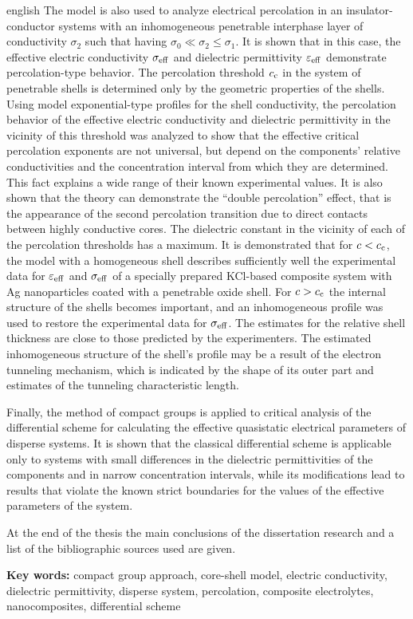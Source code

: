 \begin{otherlanguage*}{english}
The model is also used to analyze electrical percolation in an insulator-conductor systems with an inhomogeneous penetrable interphase layer of conductivity $\sigma_2$ such that having $ \sigma_0 \ll \sigma_2 \leq \sigma_1 $. It is shown that in this case, the effective electric conductivity $ \sigma _ {\rm eff} $ and dielectric permittivity $ \varepsilon _ {\rm eff} $ demonstrate percolation-type behavior.
The percolation threshold $ c _ {\rm c} $ in the system of penetrable shells is determined only by the geometric properties of the shells.  Using model exponential-type profiles for the shell conductivity, the percolation behavior of the effective electric conductivity and dielectric permittivity in the vicinity of this threshold was analyzed to show that the effective critical percolation exponents are not universal, but depend on the components' relative conductivities and the concentration interval from which they are determined. This fact explains a wide range of their known experimental values.
It is also shown that the theory can demonstrate the ``double percolation'' effect, that is the appearance of the second percolation transition due to direct contacts between highly conductive cores. The dielectric constant in the vicinity of each of the percolation thresholds has a maximum.
It is demonstrated that for $c<c_{\rm c}$, the model with a homogeneous shell describes sufficiently well the experimental data for $ \varepsilon _ {\rm eff} $ and $ \sigma _ {\rm eff} $ of a specially prepared KCl-based composite  system with Ag nanoparticles coated with a penetrable oxide shell. For $ c> c _ {\rm c} $ the internal structure of the shells becomes important, and an inhomogeneous profile was used to restore the experimental data for $ \sigma _ {\rm eff} $. The  estimates for the relative shell thickness are close to those predicted by the experimenters. The estimated inhomogeneous structure of the shell's profile may be a result of the electron tunneling mechanism, which is indicated by the shape of its outer part and estimates of the tunneling characteristic length.

Finally, the method of compact groups is applied to critical analysis of the differential scheme for calculating the effective quasistatic electrical parameters of disperse systems. It is shown that the classical differential scheme is applicable only to systems with small differences in the dielectric permittivities of the components and in narrow concentration intervals, while its modifications lead to results that violate the known strict boundaries for the values of the effective parameters of the system.

At the end of the thesis the main conclusions of the dissertation  research and a list of the bibliographic sources used are given.

\vskip 15pt
\textbf{Key words:} compact group approach, core-shell model, electric conduc\-tivity, dielectric permittivity, disperse system, percolation, composite electro\-lytes, nanocomposites, differential scheme

\end{otherlanguage*}